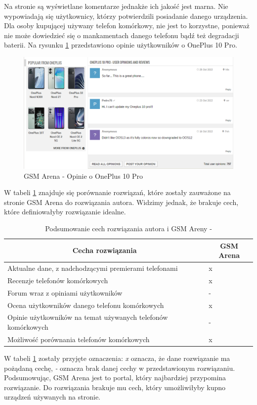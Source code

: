 Na stronie są wyświetlane komentarze jednakże ich jakość jest marna. Nie wypowiadają się użytkownicy, którzy potwierdzili posiadanie danego urządzenia. Dla osoby kupującej używany telefon komórkowy, nie jest to korzystne, ponieważ nie może dowiedzieć się o mankamentach danego telefonu bądź też degradacji baterii. Na rysunku \ref{GSM_Arena_5} przedstawiono opinie użytkowników o OnePlus 10 Pro.
\begin{figure}[H]
    \centering
    \includegraphics[scale=0.52]{img/GSM Arena/Comments.png}
    \caption{GSM Arena - Opinie o OnePlus 10 Pro}
    \label{GSM_Arena_5}
\end{figure}

W tabeli \ref*{comparison_gsm_arena} znajduje się porównanie rozwiązań, które zostały zauważone na stronie GSM Arena do rozwiązania autora. Widzimy jednak, że brakuje cech, które definiowałyby rozwiązanie idealne.
\begin{table}[H]
    \centering
        \begin{tabular}{|l|l|}
        \hline
        \multicolumn{1}{|c|}{Cecha rozwiązania} & \multicolumn{1}{c|}{GSM Arena} \\ \hline
        Aktualne dane, z nadchodzącymi premierami telefonami & x \\ \hline
        Recenzje telefonów komórkowych & x \\ \hline
        Forum wraz z opiniami użytkowników & - \\ \hline
        Ocena użytkowników danego telefonu komórkowych & x \\ \hline
        Opinie użytkowników na temat używanych telefonów komórkowych & -                                 \\ \hline
        Możliwość porównania telefonów komórkowych                      & x                                \\ \hline
        \end{tabular}
    \caption{Podsumowanie cech rozwiązania autora i GSM Areny -}
\label{comparison_gsm_arena}
\end{table}
W tabeli \ref*{comparison_gsm_arena} zostały przyjęte oznaczenia: \textit{x} oznacza, że dane rozwiązanie ma pożądaną cechę, \textit{-} oznacza brak danej cechy w przedstawionym rozwiązaniu.
Podsumowując, GSM Arena jest to portal, który najbardziej przypomina rozwiązanie. Do rozwiązania brakuje mu cech, który umożliwiłyby kupno urządzeń używanych na stronie.


